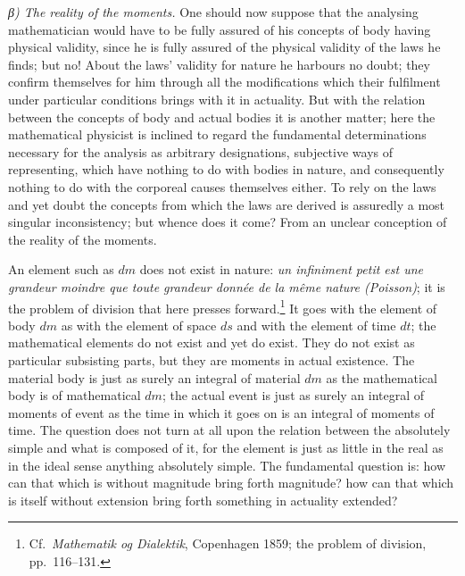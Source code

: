 \documentclass[12pt,a4paper]{book}
\newcommand{\subrunin}[1]{\emph{#1}\hspace{0.4em}}
\begin{document}
\subrunin{β) The reality of the moments.} One should now suppose that the analysing
mathematician would have to be fully assured of his concepts of body having physical validity,
since he is fully assured of the physical validity of the laws he finds; but no! About the
laws' validity for nature he harbours no doubt; they confirm themselves for him through all the
modifications which their fulfilment under particular conditions brings with it in actuality.
But with the relation between the concepts of body and actual bodies it is another matter; here
the mathematical physicist is inclined to regard the fundamental determinations necessary for
the analysis as arbitrary designations, subjective ways of representing, which have nothing to
do with bodies in nature,
and consequently nothing to do with the corporeal causes themselves either. To rely on the laws
and yet doubt the concepts from which the laws are derived is assuredly a most singular
inconsistency; but whence does it come? From an unclear conception of the reality of the
moments.

An element such as $dm$ does not exist in nature: \textit{un infiniment petit est une grandeur
moindre que toute grandeur donnée de la même nature (Poisson)}; it is the problem of division
that here presses forward.\footnote{%
Cf.\ \emph{Mathematik og Dialektik}, Copenhagen 1859; the problem of division,
pp.\ 116--131.}
It goes with the element of body $dm$ as with the element of space $ds$ and with the element of
time $dt$; the mathematical elements do not exist and yet do exist. They do not exist as
particular subsisting parts, but they are moments in actual existence. The material body is just
as surely an integral of material $dm$ as the mathematical body is of mathematical $dm$; the
actual event is just as surely an integral of moments of event as the time in which it goes on
is an integral of moments of time. The question does not turn at all upon the relation between
the absolutely simple and what is composed of it, for the element is just as little in the real
as in the ideal sense anything absolutely simple. The fundamental question is: how can that
which is without magnitude bring forth magnitude? how can that which is itself without extension
bring forth something in actuality extended?
\end{document}
